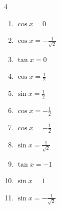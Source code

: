 \begin{multicols}{4}
\begin{enumerate}
  \item $\displaystyle \cos{x}  = 0$


  \item $\displaystyle \cos{x}  = -\frac{1}{\sqrt{2}}$


  \item $\displaystyle \tan{x}  = 0$

        \phantom{$\displaystyle x = 0 , \pi$}

  \item $\displaystyle \cos{x}  = \frac{1}{2}$


  \item $\displaystyle \sin{x}  = \frac{1}{2}$


\columnbreak %

  \item $\displaystyle \cos{x}  = -\frac{1}{2}$


  \item $\displaystyle \cos{x}  = -\frac{1}{2}$


  \item $\displaystyle \sin{x}  = \frac{1}{\sqrt{2}}$


  \item $\displaystyle \tan{x}  = -1$


  \item $\displaystyle \sin{x}  = 1$


  \item $\displaystyle \sin{x}  = -\frac{1}{\sqrt{2}}$



\end{enumerate}
\end{multicols}
